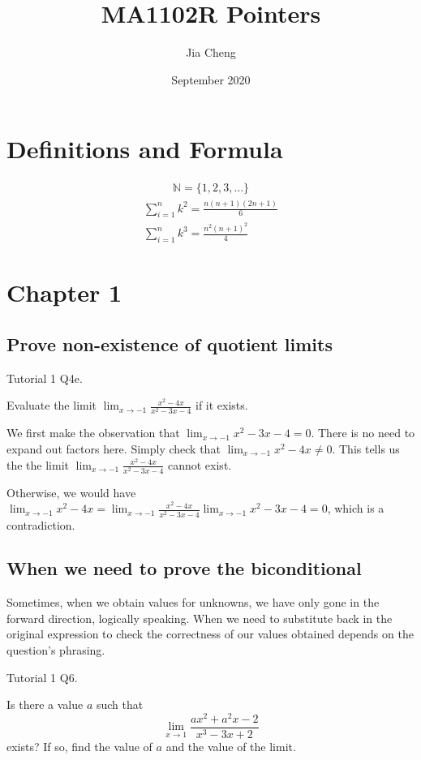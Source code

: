 \documentclass{article}
\title{MA1102R Pointers}
\author{Jia Cheng}
\date{September 2020}
\begin{document}
\maketitle

\section{Definitions and Formula}
\begin{align*}
    \mathbb{N}=\{1,2,3,\dots\}
\end{align*}
\begin{align*}
    \sum_{i=1}^nk^2=\frac{n(n+1)(2n+1)}{6}\\
    \sum_{i=1}^nk^3=\frac{n^2(n+1)^2}{4}
\end{align*}

\section{Chapter 1}
\subsection{Prove non-existence of quotient limits}
Tutorial 1 Q4e.

Evaluate the limit $\lim_{x\rightarrow -1}\frac{x^2-4x}{x^2-3x-4}$ if it exists.

We first make the observation that $\lim_{x\rightarrow -1}x^2-3x-4=0$. There is no need to expand out factors here. Simply check that $\lim_{x\rightarrow -1}x^2-4x\neq 0$. This tells us the the limit $\lim_{x\rightarrow -1}\frac{x^2-4x}{x^2-3x-4}$ cannot exist.

Otherwise, we would have $\lim_{x\rightarrow -1}x^2-4x=\lim_{x\rightarrow -1}\frac{x^2-4x}{x^2-3x-4}\lim_{x\rightarrow -1}x^2-3x-4=0$, which is a contradiction.\\

\subsection{When we need to prove the biconditional}
Sometimes, when we obtain values for unknowns, we have only gone in the forward direction, logically speaking. When we need to substitute back in the original expression to check the correctness of our values obtained depends on the question's phrasing.

Tutorial 1 Q6.

Is there a value $a$ such that $$\lim_{x\rightarrow 1}\frac{ax^2+a^2x-2}{x^3-3x+2}$$ exists? If so, find the value of $a$ and the value of the limit.
\end{document}
